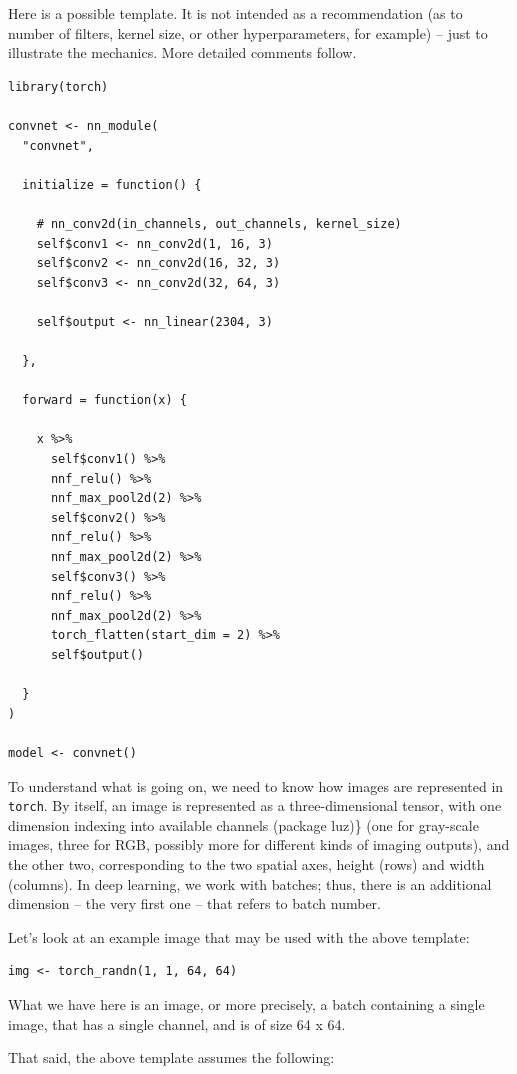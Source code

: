 \documentclass[
  letterpaper,
]{krantz}
\begin{document}
Here is a possible template. It is not intended as a recommendation (as
to number of filters, kernel size, or other hyperparameters, for
example) -- just to illustrate the mechanics. More detailed comments
follow.

\begin{verbatim}
library(torch)

convnet <- nn_module(
  "convnet",
  
  initialize = function() {
    
    # nn_conv2d(in_channels, out_channels, kernel_size)
    self$conv1 <- nn_conv2d(1, 16, 3)
    self$conv2 <- nn_conv2d(16, 32, 3)
    self$conv3 <- nn_conv2d(32, 64, 3)
    
    self$output <- nn_linear(2304, 3)

  },
  
  forward = function(x) {
    
    x %>% 
      self$conv1() %>% 
      nnf_relu() %>%
      nnf_max_pool2d(2) %>%
      self$conv2() %>% 
      nnf_relu() %>%
      nnf_max_pool2d(2) %>%
      self$conv3() %>% 
      nnf_relu() %>%
      nnf_max_pool2d(2) %>%
      torch_flatten(start_dim = 2) %>%
      self$output()
      
  }
)

model <- convnet()
\end{verbatim}

To understand what is going on, we need to know how images are
represented in \texttt{torch}. By itself, an image is represented as a
three-dimensional tensor, with one dimension indexing into available
channels (package luz)\} (one for gray-scale
images, three for RGB, possibly more for different kinds of imaging
outputs), and the other two, corresponding to the two spatial axes,
height (rows) and width (columns). In deep learning, we work with
batches; thus, there is an additional dimension
-- the very first one -- that refers to batch number.

Let's look at an example image that may be used with the above template:

\begin{verbatim}
img <- torch_randn(1, 1, 64, 64)
\end{verbatim}

What we have here is an image, or more precisely, a batch containing a
single image, that has a single channel, and is of size 64 x 64.

That said, the above template assumes the following:
\end{document}
